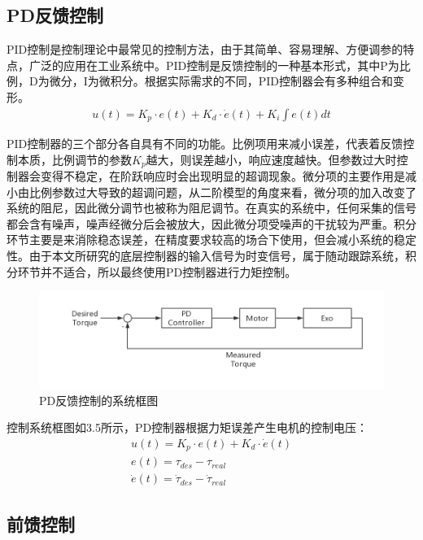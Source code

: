 \subsection{PD反馈控制}

PID控制是控制理论中最常见的控制方法，由于其简单、容易理解、方便调参的特点，广泛的应用在工业系统中。PID控制是反馈控制的一种基本形式，其中P为比例，D为微分，I为微积分。根据实际需求的不同，PID控制器会有多种组合和变形。
\begin{align}
    u(t) = K_p \cdot e(t) + K_d \cdot \dot{e}(t) + K_i\int e(t) dt
\end{align}

PID控制器的三个部分各自具有不同的功能。比例项用来减小误差，代表着反馈控制本质，比例调节的参数$K_p$越大，则误差越小，响应速度越快。但参数过大时控制器会变得不稳定，在阶跃响应时会出现明显的超调现象。微分项的主要作用是减小由比例参数过大导致的超调问题，从二阶模型的角度来看，微分项的加入改变了系统的阻尼，因此微分调节也被称为阻尼调节。在真实的系统中，任何采集的信号都会含有噪声，噪声经微分后会被放大，因此微分项受噪声的干扰较为严重。积分环节主要是来消除稳态误差，在精度要求较高的场合下使用，但会减小系统的稳定性。由于本文所研究的底层控制器的输入信号为时变信号，属于随动跟踪系统，积分环节并不适合，所以最终使用PD控制器进行力矩控制。

\begin{figure}[htb]
    \includegraphics[width=15cm]{fig/f54.jpg}
    \caption{PD反馈控制的系统框图}
    \label{fig:mark}
\end{figure}

控制系统框图如3.5所示，PD控制器根据力矩误差产生电机的控制电压：
\begin{align}
    u(t) = K_p \cdot e(t) + K_d \cdot \dot{e}(t) \\
    e(t) = \tau_{des} - \tau_{real} \\
    \dot e(t) = \dot\tau_{des} - \dot \tau_{real}
\end{align}

\subsection{前馈控制}

